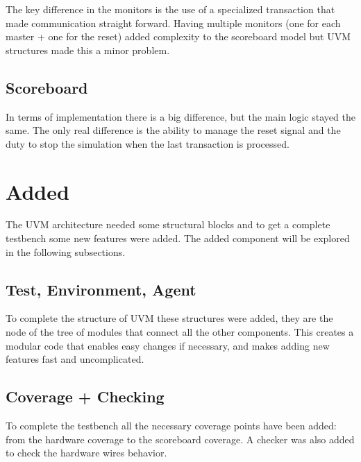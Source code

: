 The key difference in the monitors is the use of a specialized transaction that made communication straight forward.
Having multiple monitors (one for each master + one for the reset) added complexity to the scoreboard model but UVM structures made this a minor problem.

\subsection*{Scoreboard}

In terms of implementation there is a big difference, but the main logic stayed the same.
The only real difference is the ability to manage the reset signal and the duty to stop the simulation when the last transaction is processed.

\section{Added}

The UVM architecture needed some structural blocks and to get a complete testbench some new features were added.
The added component will be explored in the following subsections.

\subsection*{Test, Environment, Agent}

To complete the structure of UVM these structures were added, they are the node of the tree of modules that connect all the other components.
This creates a modular code that enables easy changes if necessary, and makes adding new features fast and uncomplicated.

\subsection*{Coverage + Checking}

To complete the testbench all the necessary coverage points have been added: from the hardware coverage to the scoreboard coverage.
A checker was also added to check the hardware wires behavior.